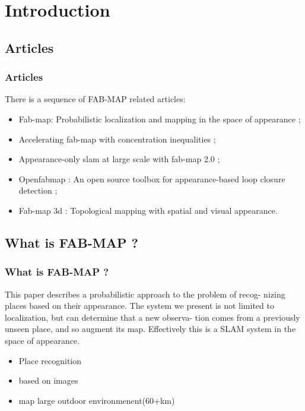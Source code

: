 \section{Introduction}

\subsection{Articles}
\begin{frame}
    \frametitle{Articles}
    There is a sequence of FAB-MAP related articles:
    \begin{itemize}
        \item Fab-map: Probabilistic localization and mapping in the space of appearance\cite{fabmap2008} ;
        \item Accelerating fab-map with concentration inequalities\cite{accelerating} ;
        \item Appearance-only slam at large scale with fab-map 2.0\cite{fabmap2011} ;
        \item Openfabmap : An open source toolbox for appearance-based loop closure detection\cite{openfabmap} ;
        \item Fab-map 3d : Topological mapping with spatial and visual appearance\cite{fabmap3d}.
    \end{itemize}
\end{frame}

\subsection{What is FAB-MAP ?}
\begin{frame}
    \frametitle{What is FAB-MAP ?}
    This paper describes a probabilistic approach to the problem of recog- nizing places based on their appearance. The system we present is not limited to localization, but can determine that a new observa- tion comes from a previously unseen place, and so augment its map. Effectively this is a SLAM system in the space of appearance.
    \begin{itemize}
        \item Place recognition
        \item based on images
        \item map large outdoor environmenent(60+km)
    \end{itemize}
\end{frame}

